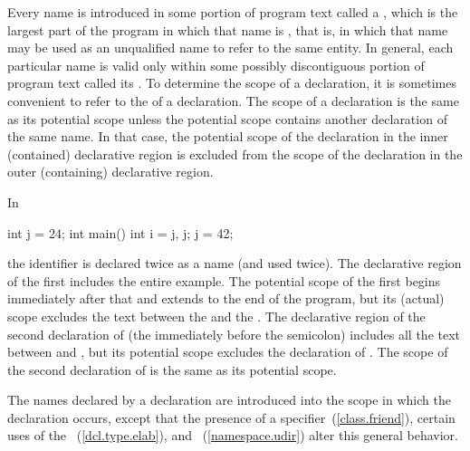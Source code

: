 \pnum
{}%
Every name is introduced in some portion of program text called a
%
%
, which is the largest part of the program
in which that name is , that is, in which that name may
be used as an unqualified name to refer to the same entity. In general,
each particular name is valid only within some possibly discontiguous
portion of program text called its . To determine the
scope of a declaration, it is sometimes convenient to refer to the
 of a declaration. The scope of a declaration
is the same as its potential scope unless the potential scope contains
another declaration of the same name. In that case, the potential scope
of the declaration in the inner (contained) declarative region is
excluded from the scope of the declaration in the outer (containing)
declarative region.

\pnum
\begin{example}
In

\begin{codeblock}
int j = 24;
int main() {
  int i = j, j;
  j = 42;
}
\end{codeblock}

the identifier  is declared twice as a name (and used twice).
The declarative region of the first  includes the entire
example. The potential scope of the first  begins immediately
after that  and extends to the end of the program, but its
(actual) scope excludes the text between the \tcode{,} and the
\tcode{\}}. The declarative region of the second declaration of
 (the  immediately before the semicolon) includes all
the text between \tcode{\{} and \tcode{\}}, but its potential scope
excludes the declaration of . The scope of the second
declaration of  is the same as its potential scope.
\end{example}

\pnum
The names declared by a declaration are introduced into the scope in
which the declaration occurs, except that the presence of a
 specifier~(\ref{class.friend}), certain uses of the
~(\ref{dcl.type.elab}), and
~(\ref{namespace.udir}) alter this general
behavior.

